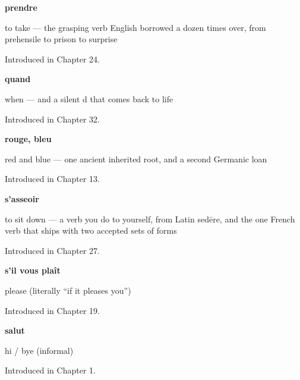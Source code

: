 \noindent\begin{minipage}[t]{\linewidth}
\raggedright
\textbf{prendre}\par
\small to take — the grasping verb English borrowed a dozen times over, from prehensile to prison to surprise\par
\footnotesize Introduced in Chapter 24.
\end{minipage}\par\medskip

\noindent\begin{minipage}[t]{\linewidth}
\raggedright
\textbf{quand}\par
\small when — and a silent d that comes back to life\par
\footnotesize Introduced in Chapter 32.
\end{minipage}\par\medskip

\noindent\begin{minipage}[t]{\linewidth}
\raggedright
\textbf{rouge, bleu}\par
\small red and blue — one ancient inherited root, and a second Germanic loan\par
\footnotesize Introduced in Chapter 13.
\end{minipage}\par\medskip

\noindent\begin{minipage}[t]{\linewidth}
\raggedright
\textbf{s'asseoir}\par
\small to sit down — a verb you do to yourself, from Latin sedēre, and the one French verb that ships with two accepted sets of forms\par
\footnotesize Introduced in Chapter 27.
\end{minipage}\par\medskip

\noindent\begin{minipage}[t]{\linewidth}
\raggedright
\textbf{s'il vous plaît}\par
\small please (literally \textquotedblleft{}if it pleases you\textquotedblright{})\par
\footnotesize Introduced in Chapter 19.
\end{minipage}\par\medskip

\noindent\begin{minipage}[t]{\linewidth}
\raggedright
\textbf{salut}\par
\small hi / bye (informal)\par
\footnotesize Introduced in Chapter 1.
\end{minipage}\par\medskip

